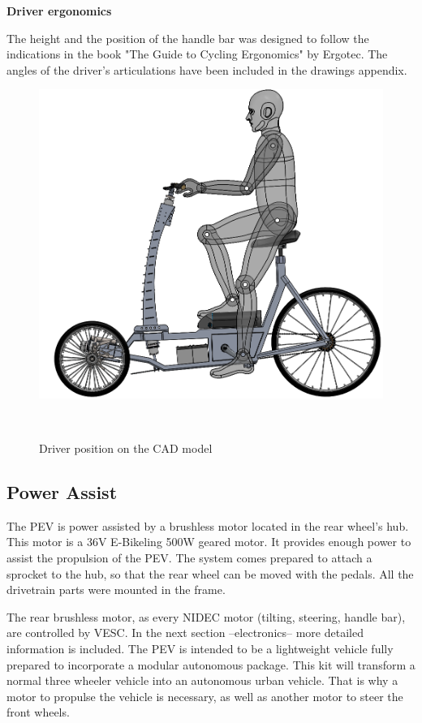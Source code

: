 \textbf{Driver ergonomics}

The height and the position of the handle bar was designed to follow the indications in the book "The Guide to Cycling Ergonomics" by Ergotec\cite{ergonomics}. The angles of the driver's articulations have been included in the drawings appendix.

\begin{figure}[h!]
	\includegraphics[width=1\linewidth]{figs/05/driver2}
	\caption{Driver position on the CAD model}
	\\[0cm]
\end{figure}

\newpage
\subsection{Power Assist}

The PEV is power assisted by a brushless motor located in the rear wheel's hub. This motor is a 36V E-Bikeling 500W geared motor\cite{ebikeling}. It provides enough power to assist the propulsion of the PEV. The system comes prepared to attach a sprocket to the hub, so that the rear wheel can be moved with the pedals. All the drivetrain parts were mounted in the frame.

The rear brushless motor, as every NIDEC motor (tilting, steering, handle bar), are controlled by VESC. In the next section --electronics-- more detailed information is included. The PEV is intended to be a lightweight vehicle fully prepared to incorporate a modular autonomous package. This kit will transform a normal three wheeler vehicle into an autonomous urban vehicle. That is why a motor to propulse the vehicle is necessary, as well as another motor to steer the front wheels.

